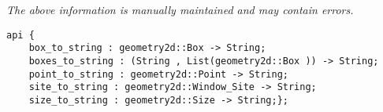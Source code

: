 \label{pkg:geometry2d\_junk}

{\tiny \it The above information is manually maintained and may contain errors.}
\begin{verbatim}
api {
    box_to_string : geometry2d::Box -> String;
    boxes_to_string : (String , List(geometry2d::Box )) -> String;
    point_to_string : geometry2d::Point -> String;
    site_to_string : geometry2d::Window_Site -> String;
    size_to_string : geometry2d::Size -> String;};
\end{verbatim}
